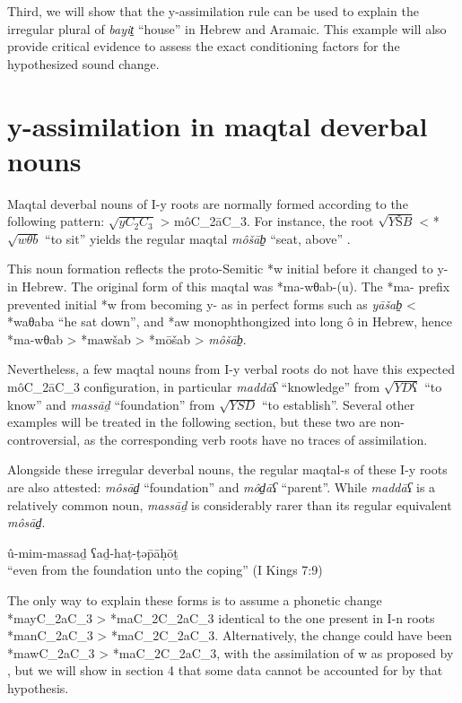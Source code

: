 \documentclass[oldfontcommands,oneside,a4paper,11pt]{article}
\newcommand{\racine}[1]{\begin{math}\sqrt{#1}\end{math}}
\newcommand{\forme}[1]{\textit{#1}}
\begin{document}
\begin{sloppypar}
	Third, we will show that the y-assimilation rule can be used to explain the irregular plural of \forme{bayit̠} ``house'' in Hebrew and Aramaic. This  example will also provide critical evidence to assess the exact conditioning factors for the hypothesized sound change.
	

\section{y-assimilation in maqtal deverbal nouns} \label{maqtal}

Maqtal deverbal nouns of I-y roots are normally formed according to the following pattern: \racine{yC_2C_3} > môC_2āC_3. For instance,  the root \racine{YŠB} < *\racine{wθb} ``to sit'' yields the regular maqtal \forme{môšāb̠} ``seat, above'' .


	This noun formation reflects the proto-Semitic *w initial before it changed to y- in Hebrew. The original form of this maqtal was *ma-wθab-(u). The *ma- prefix prevented initial *w from becoming y- as in perfect forms such as \forme{yāšab̠} < *waθaba ``he sat down'', and *aw monophthongized into long ô in Hebrew, hence *ma-wθab > *mawšab > *mōšab > \forme{môšāb̠}.
	
	
	Nevertheless, a few maqtal nouns from I-y verbal roots do not have this expected {môC_2āC_3} configuration, in particular \forme{maddāʕ} ``knowledge'' from \racine{YDʕ} ``to know'' and \forme{massāḏ} ``foundation'' from \racine{YSD} ``to establish''. Several other examples will be treated in the following section, but these two are non-controversial, as the corresponding verb roots have no traces of assimilation.
	
	
	Alongside these irregular deverbal nouns, the regular maqtal-s of these I-y roots are also attested: \forme{môsād̠} ``foundation'' and \forme{môd̠āʕ} ``parent''. While \forme{maddāʕ} is a relatively common noun, \forme{massāḏ} is considerably rarer than its regular equivalent \forme{môsād̠}. 

\begin{exe}
\ex \label{fondation}
	 û-mim-massaḏ ʕaḏ-haṭ-ṭǝp̄āḥōṯ  \\
 ``even from the foundation unto the coping'' (I Kings 7:9)
\end{exe}

The only way to explain these forms is to assume a phonetic change  *mayC_2aC_3 > *{maC_2C_2aC_3}   identical to the one present in I-n roots *manC_2aC_3 > *maC_2C_2aC_3. Alternatively, the change could have been *mawC_2aC_3 > *maC_2C_2aC_3, with the assimilation of w as proposed by \citet{huehnergard06}, but we will show in section 4 that some data cannot be accounted for by that hypothesis.


\end{sloppypar}
\end{document}
